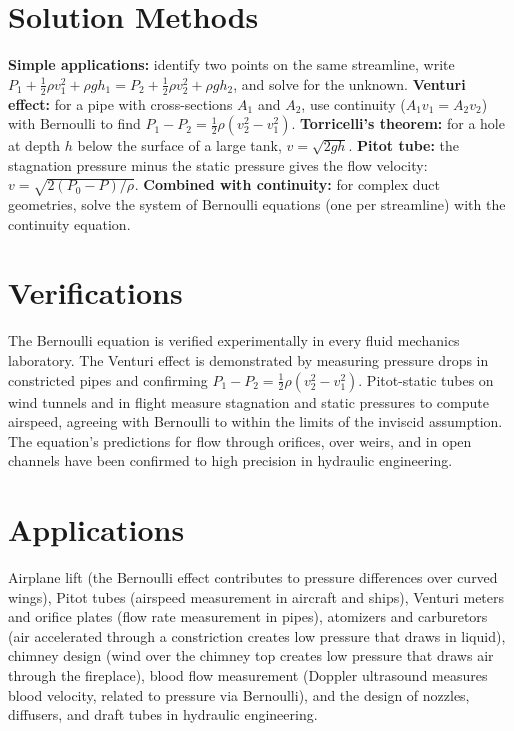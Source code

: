 \section*{Solution Methods}

\textbf{Simple applications:} identify two points on the same streamline, write $P_1 + \frac{1}{2}\rho v_1^2 + \rho gh_1 = P_2 + \frac{1}{2}\rho v_2^2 + \rho gh_2$, and solve for the unknown. \textbf{Venturi effect:} for a pipe with cross-sections $A_1$ and $A_2$, use continuity ($A_1 v_1 = A_2 v_2$) with Bernoulli to find $P_1 - P_2 = \frac{1}{2}\rho(v_2^2 - v_1^2)$. \textbf{Torricelli's theorem:} for a hole at depth $h$ below the surface of a large tank, $v = \sqrt{2gh}$. \textbf{Pitot tube:} the stagnation pressure minus the static pressure gives the flow velocity: $v = \sqrt{2(P_0 - P)/\rho}$. \textbf{Combined with continuity:} for complex duct geometries, solve the system of Bernoulli equations (one per streamline) with the continuity equation.
\section*{Verifications}

The Bernoulli equation is verified experimentally in every fluid mechanics laboratory. The Venturi effect is demonstrated by measuring pressure drops in constricted pipes and confirming $P_1 - P_2 = \frac{1}{2}\rho(v_2^2 - v_1^2)$. Pitot-static tubes on wind tunnels and in flight measure stagnation and static pressures to compute airspeed, agreeing with Bernoulli to within the limits of the inviscid assumption. The equation's predictions for flow through orifices, over weirs, and in open channels have been confirmed to high precision in hydraulic engineering.
\section*{Applications}

Airplane lift (the Bernoulli effect contributes to pressure differences over curved wings), Pitot tubes (airspeed measurement in aircraft and ships), Venturi meters and orifice plates (flow rate measurement in pipes), atomizers and carburetors (air accelerated through a constriction creates low pressure that draws in liquid), chimney design (wind over the chimney top creates low pressure that draws air through the fireplace), blood flow measurement (Doppler ultrasound measures blood velocity, related to pressure via Bernoulli), and the design of nozzles, diffusers, and draft tubes in hydraulic engineering.
